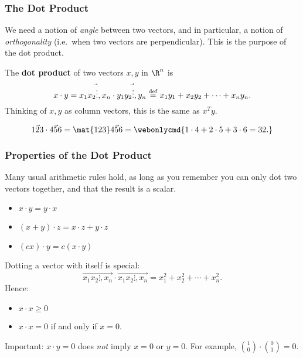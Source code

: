 
\begin{frame}
\frametitle{The Dot Product}

We need a notion of \emph{angle} between two vectors, and in particular, a
notion of \emph{orthogonality} (i.e.\ when two vectors are perpendicular).
\pause
This is the purpose of the dot product.

\pause
\begin{defn}
  The \textbf{dot product} of two vectors $x,y$ in $\R^n$ is
  \[ x\cdot y = \vec{x_1 x_2 \vdots, x_n} \cdot \vec{y_1 y_2 \vdots, y_n}
  \overset{\rm def}= x_1y_1 + x_2y_2 + \cdots + x_ny_n. \]
  \pause
  Thinking of $x,y$ as column vectors, this is the same as $x^Ty$.
\end{defn}

\pause
\begin{eg}
  \[ \vec{1 2 3}\cdot\vec{4 5 6} = \mat{1 2 3}\vec{4 5 6}
  = \webonlycmd{1\cdot 4 + 2\cdot 5 + 3\cdot 6 = 32.} \]
\end{eg}

\end{frame}



\begin{frame}
\frametitle{Properties of the Dot Product}

Many usual arithmetic rules hold, as long as you remember you can only dot two
vectors together, and that the result is a scalar.

\pause
\begin{itemize}
\item $x\cdot y = y \cdot x$
  \pause
\item $(x + y)\cdot z = x\cdot z+y\cdot z$
  \pause
\item $(cx)\cdot y = c(x\cdot y)$
\end{itemize}

\pause\medskip
Dotting a vector with itself is special:
\[ \vec{x_1 x_2 \vdots, x_n}\cdot\vec{x_1 x_2 \vdots, x_n}
= x_1^2 + x_2^2 + \cdots + x_n^2. \]
Hence:
\pause
\begin{itemize}
\item $x\cdot x\geq 0$
  \pause
\item $x\cdot x = 0$ if and only if $x = 0$.
\end{itemize}

\pause\medskip
\alert{Important:} $x\cdot y = 0$ does \emph{not} imply $x = 0$ or $y = 0$.
\pause
For example, ${1\choose 0} \cdot {0\choose 1} = 0$.

\end{frame}


